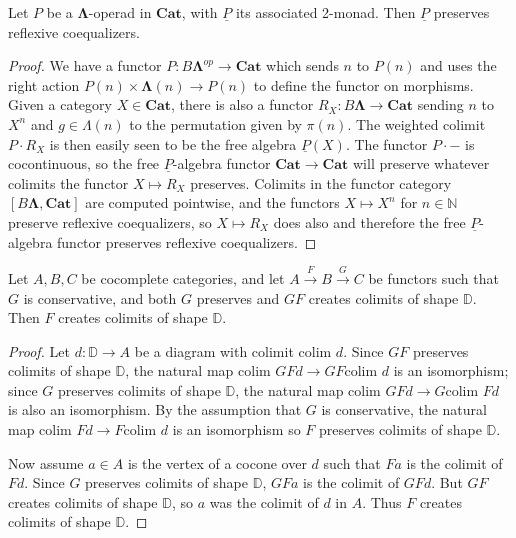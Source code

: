 \documentclass{amsbook} %
\newcommand{\mb}{\mathbf}
\newcommand{\colim}{\textrm{colim }}
\newcommand{\und}[1]{\ensuremath{\underline{#1}}}
\newcommand{\ML}{\mathbf{\Lambda}}
\newcommand{\cat}{\ensuremath{\mb{Cat}}}
\numberwithin{section}{chapter}
\begin{document}
\begin{lem}\label{P_pres_refl}
Let $P$ be a $\ML$-operad in $\cat$, with $\und{P}$ its associated 2-monad. Then $\und{P}$ preserves reflexive coequalizers.

\end{lem}
\begin{proof}
We have a functor $P:B\ML^{op} \to \cat$ which sends $n$ to $P(n)$ and uses the right action $P(n) \times \ML(n) \to P(n)$ to define the functor on morphisms. Given a category $X \in \cat$, there is also a functor $R_X:B\ML \to \cat$ sending $n$ to $X^n$ and $g \in \Lambda(n)$ to the permutation given by $\pi(n)$. The weighted colimit $P \cdot R_X$ is then easily seen to be the free algebra $\und{P}(X)$. The functor $P \cdot -$ is cocontinuous, so the free $\und{P}$-algebra functor $\cat \to \cat$ will preserve whatever colimits the functor $X \mapsto R_X$ preserves. Colimits in the functor category $[B\ML, \cat]$ are computed pointwise, and the functors $X \mapsto X^n$ for $n \in \mathbb{N}$ preserve reflexive coequalizers, so $X \mapsto R_X$ does also and therefore the free $\und{P}$-algebra functor preserves reflexive coequalizers.
\end{proof}

\begin{lem}\label{creation_triangle}
Let $A,B,C$ be cocomplete categories, and let $A \stackrel{F}{\to} B \stackrel{G}{\to} C$ be functors such that $G$ is conservative, and both $G$ preserves and $GF$ creates colimits of shape $\mathbb{D}$. Then $F$ creates colimits of shape $\mathbb{D}$.
\end{lem}
\begin{proof}
Let $d:\mathbb{D} \to A$ be a diagram with colimit $\colim d$. Since $GF$ preserves colimits of shape $\mathbb{D}$, the natural map $\colim GFd \to GF \colim d$ is an isomorphism; since $G$ preserves colimits of shape $\mathbb{D}$, the natural map $\colim GFd \to G\colim Fd$ is also an isomorphism. By the assumption that $G$ is conservative, the natural map $\colim Fd \to F\colim d$ is an isomorphism so $F$ preserves colimits of shape $\mathbb{D}$.

Now assume $a \in A$ is the vertex of a cocone over $d$ such that $Fa$ is the colimit of $Fd$. Since $G$ preserves colimits of shape $\mathbb{D}$, $GFa$ is the colimit of $GFd$. But $GF$ creates colimits of shape $\mathbb{D}$, so $a$ was the colimit of $d$ in $A$. Thus $F$ creates colimits of shape $\mathbb{D}$.
\end{proof}
\end{document}
